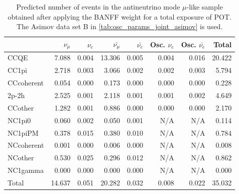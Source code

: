 
\begin{table}
\center
\begin{tabular} { | l ||r | r | r | r | r | r | | r | }
\hline
             & $\nu_\mu$            & $\nu_e$              & $\bar{\nu_\mu}$      & $\bar{\nu_e}$        & Osc. $\nu_e$         & Osc. $\bar{\nu_e}$   & Total                \\ \hline\hline
 CCQE         & 7.088                & 0.004                & 13.306               & 0.005                & 0.004                & 0.016                & 20.422               \\ \hline
 CC1pi        & 2.718                & 0.003                & 3.066                & 0.002                & 0.002                & 0.003                & 5.794                \\ \hline
 CCcoherent   & 0.054                & 0.000                & 0.173                & 0.000                & 0.000                & 0.000                & 0.228                \\ \hline
 2p-2h          & 2.525                & 0.001                & 2.118                & 0.001                & 0.001                & 0.002                & 4.649                \\ \hline
 CCother      & 1.282                & 0.001                & 0.886                & 0.000                & 0.000                & 0.000                & 2.170                \\ \hline
 NC1pi0       & 0.060                & 0.002                & 0.050                & 0.001                & N/A                  & N/A                  & 0.114                \\ \hline
 NC1piPM      & 0.378                & 0.015                & 0.380                & 0.010                & N/A                  & N/A                  & 0.784                \\ \hline
 NCcoherent   & 0.001                & 0.000                & 0.006                & 0.000                & N/A                  & N/A                  & 0.008                \\ \hline
 NCother      & 0.530                & 0.025                & 0.296                & 0.012                & N/A                  & N/A                  & 0.862                \\ \hline
 NC1gamma     & 0.000                & 0.000                & 0.000                & 0.000                & N/A                  & N/A                  & 0.000                \\ \hline
\hline
 Total        & 14.637               & 0.051                & 20.282               & 0.032                & 0.008                & 0.022                & 35.032               \\ \hline

\end{tabular}
\caption{
Predicted number of events in the antineutrino mode $\mu$-like sample
obtained after applying the BANFF weight
for a total exposure of \TotalPotNuBar{} POT.
The Asimov data set B in \cref{tab:osc_params_joint_asimov} is used.
}
\label{tab:events_rhc1rmu_Asimov_B}
\end{table}


